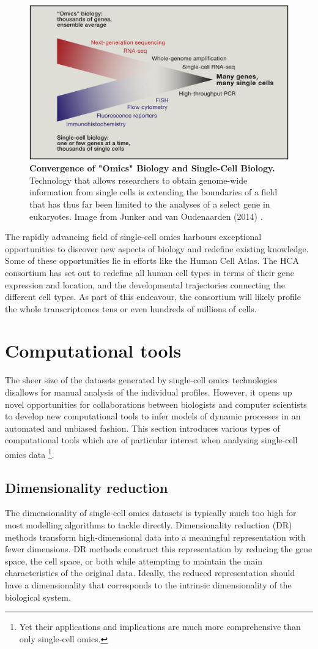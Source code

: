 \begin{figure}
	\centering\includegraphics[width=.5\linewidth]{fig/introduction/profiling_convergence} %
	\caption{
		\textbf{Convergence of "Omics" Biology and Single-Cell Biology.} Technology that allows researchers to obtain genome-wide information from single cells is extending the boundaries of a field that has thus far been limited to the analyses of a select gene in eukaryotes. Image from Junker and van Oudenaarden (2014) \cite{junker_everycellspecial_2014}. %
	}
	\label{fig:profiling_convergence}
\end{figure}

The rapidly advancing field of single-cell omics harbours exceptional opportunities to discover new aspects of biology and redefine existing knowledge. Some of these opportunities lie in efforts like the Human Cell Atlas. The HCA consortium has set out to redefine all human cell types in terms of their gene expression and location, and the developmental trajectories connecting the different cell types. As part of this endeavour, the consortium will likely profile the whole transcriptomes tens or even hundreds of millions of cells. 

\section{Computational tools}
The sheer size of the datasets generated by single-cell omics technologies disallows for manual analysis of the individual profiles. However, it opens up novel opportunities for collaborations between biologists and computer scientists to develop new computational tools to infer models of dynamic processes in an automated and unbiased fashion. This section introduces various types of computational tools which are of particular interest when analysing single-cell omics data \footnote{Yet their applications and implications are much more comprehensive than only single-cell omics.}.
\subsection{Dimensionality reduction}
The dimensionality of single-cell omics datasets is typically much too high for most modelling algorithms to tackle directly. Dimensionality reduction (DR) methods transform high-dimensional data into a meaningful representation with fewer dimensions. DR methods construct this representation by reducing the gene space, the cell space, or both while attempting to maintain the main characteristics of the original data.
Ideally, the reduced representation should have a dimensionality that corresponds to the intrinsic dimensionality of the biological system.

